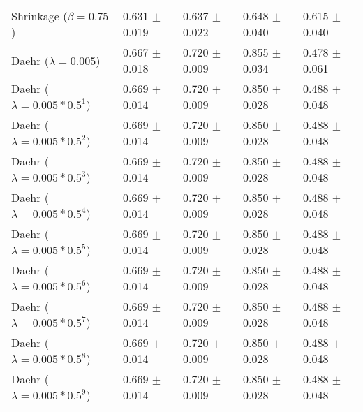 \begin{table}
\begin{tabular}{*{5}{l}}
Shrinkage ($\beta=0.75$)&0.631 $\pm$ 0.019&0.637 $\pm$ 0.022&0.648 $\pm$ 0.040&0.615 $\pm$ 0.040\\
Daehr ($\lambda=0.005$)&0.667 $\pm$ 0.018&0.720 $\pm$ 0.009&0.855 $\pm$ 0.034&0.478 $\pm$ 0.061\\
Daehr ($\lambda=0.005*0.5^1$)&0.669 $\pm$ 0.014&0.720 $\pm$ 0.009&0.850 $\pm$ 0.028&0.488 $\pm$ 0.048\\
Daehr ($\lambda=0.005*0.5^2$)&0.669 $\pm$ 0.014&0.720 $\pm$ 0.009&0.850 $\pm$ 0.028&0.488 $\pm$ 0.048\\
Daehr ($\lambda=0.005*0.5^3$)&0.669 $\pm$ 0.014&0.720 $\pm$ 0.009&0.850 $\pm$ 0.028&0.488 $\pm$ 0.048\\
Daehr ($\lambda=0.005*0.5^4$)&0.669 $\pm$ 0.014&0.720 $\pm$ 0.009&0.850 $\pm$ 0.028&0.488 $\pm$ 0.048\\
Daehr ($\lambda=0.005*0.5^5$)&0.669 $\pm$ 0.014&0.720 $\pm$ 0.009&0.850 $\pm$ 0.028&0.488 $\pm$ 0.048\\
Daehr ($\lambda=0.005*0.5^6$)&0.669 $\pm$ 0.014&0.720 $\pm$ 0.009&0.850 $\pm$ 0.028&0.488 $\pm$ 0.048\\
Daehr ($\lambda=0.005*0.5^7$)&0.669 $\pm$ 0.014&0.720 $\pm$ 0.009&0.850 $\pm$ 0.028&0.488 $\pm$ 0.048\\
Daehr ($\lambda=0.005*0.5^8$)&0.669 $\pm$ 0.014&0.720 $\pm$ 0.009&0.850 $\pm$ 0.028&0.488 $\pm$ 0.048\\
Daehr ($\lambda=0.005*0.5^9$)&0.669 $\pm$ 0.014&0.720 $\pm$ 0.009&0.850 $\pm$ 0.028&0.488 $\pm$ 0.048\\
\bottomrule
\end{tabular}
\end{table}

